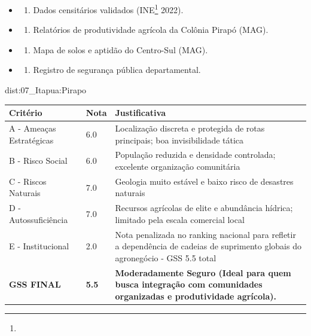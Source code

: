 {\begin{itemize}
\tightlist
\item
  \begin{enumerate}
  \def\labelenumi{\arabic{enumi})}
  \tightlist
  \item
    Dados censitários validados (INE\footnote{\fineINE} 2022).
  \end{enumerate}
\item
  \begin{enumerate}
  \def\labelenumi{\arabic{enumi})}
  \setcounter{enumi}{1}
  \tightlist
  \item
    Relatórios de produtividade agrícola da Colônia Pirapó (MAG).
  \end{enumerate}
\item
  \begin{enumerate}
  \def\labelenumi{\arabic{enumi})}
  \setcounter{enumi}{2}
  \tightlist
  \item
    Mapa de solos e aptidão do Centro-Sul (MAG).
  \end{enumerate}
\item
  \begin{enumerate}
  \def\labelenumi{\arabic{enumi})}
  \setcounter{enumi}{3}
  \tightlist
  \item
    Registro de segurança pública departamental.
  \end{enumerate}
\end{itemize}}{dist:07_Itapua:Pirapo}
\begin{table}[ht!]
\small \begin{tabular}{p{3.0cm}p{0.8cm}p{6.0cm}} \toprule
\textbf{Critério} & \textbf{Nota} & \textbf{Justificativa} \\ \midrule
A - Ameaças Estratégicas & 6.0 & Localização discreta e protegida de rotas principais; boa invisibilidade tática \\
B - Risco Social & 6.0 & População reduzida e densidade controlada; excelente organização comunitária \\
C - Riscos Naturais & 7.0 & Geologia muito estável e baixo risco de desastres naturais \\
D - Autossuficiência & 7.0 & Recursos agrícolas de elite e abundância hídrica; limitado pela escala comercial local \\
E - Institucional & 2.0 & Nota penalizada no ranking nacional para refletir a dependência de cadeias de suprimento globais do agronegócio - GSS 5.5 total \\
\midrule \textbf{GSS FINAL} & \textbf{5.5} & \textbf{Moderadamente Seguro (Ideal para quem busca integração com comunidades organizadas e produtividade agrícola).} \\ \bottomrule \end{tabular}
\end{table}
